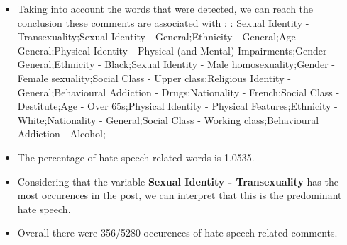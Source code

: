 \documentclass[11pt]{article}
\begin{document}
\begin{itemize}\item Taking into account the words that were detected, we can reach the conclusion these comments are associated with : : Sexual Identity - Transexuality;Sexual Identity - General;Ethnicity - General;Age - General;Physical Identity - Physical (and Mental) Impairments;Gender - General;Ethnicity - Black;Sexual Identity - Male homosexuality;Gender - Female sexuality;Social Class - Upper class;Religious Identity - General;Behavioural Addiction - Drugs;Nationality - French;Social Class - Destitute;Age - Over 65s;Physical Identity - Physical Features;Ethnicity - White;Nationality - General;Social Class - Working class;Behavioural Addiction - Alcohol;%

\item The percentage of hate speech related words is 1.0535.

\item Considering that the variable \textbf{Sexual Identity - Transexuality} has the most occurences in the post, we can interpret that this is the predominant hate speech.

\item Overall there were 356/5280 occurences of hate speech related comments.\end{itemize}
\end{document}
